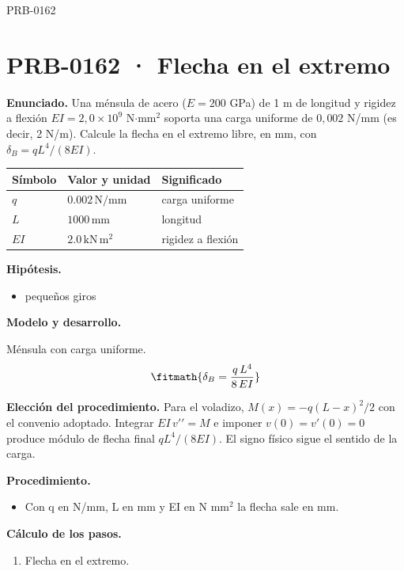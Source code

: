\begin{studiumworked}{PRB-0162}

\section{PRB-0162 · Flecha en el extremo}

\textbf{Enunciado.} Una ménsula de acero ($E = 200$ GPa) de 1 m de longitud y rigidez a flexión $E I = 2{,}0\times 10^{9}$ N$\cdot$mm$^2$ soporta una carga uniforme de $0{,}002$ N/mm (es decir, 2 N/m). Calcule la flecha en el extremo libre, en mm, con $\delta_B = q L^4/(8EI)$.

\par\medskip\noindent\begin{tabular}{@{}p{.18\linewidth}p{.26\linewidth}p{.48\linewidth}@{}}
\toprule Símbolo & Valor y unidad & Significado\\\midrule
$q$ & $0.002\,\mathrm{N/mm}$ & carga uniforme\\
$L$ & $1000\,\mathrm{mm}$ & longitud\\
$EI$ & $2.0\,\mathrm{kN\,m^2}$ & rigidez a flexión\\
\bottomrule\end{tabular}\par\medskip

\textbf{Hipótesis.}\begin{itemize}\item pequeños giros\end{itemize}

\textbf{Modelo y desarrollo.}

Ménsula con carga uniforme.\[\fitmath{\delta_B = \frac{q\,L^{4}}{8\,EI}}\]

\textbf{Elección del procedimiento.} Para el voladizo, $M(x)=-q(L-x)^2/2$ con el convenio adoptado. Integrar $EI\,v\prime\prime=M$ e imponer $v(0)=v\prime(0)=0$ produce módulo de flecha final $qL^4/(8EI)$. El signo físico sigue el sentido de la carga.

\textbf{Procedimiento.}\begin{itemize}\item Con q en N/mm, L en mm y EI en N mm$^2$ la flecha sale en mm.\end{itemize}

\textbf{Cálculo de los pasos.}

\begin{enumerate}

\item Flecha en el extremo.


\end{enumerate}
\end{studiumworked}
